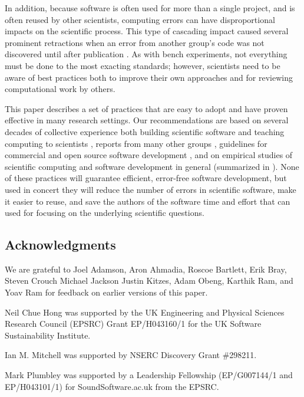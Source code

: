 \documentclass{article}
\begin{document}
In addition, because software is often used for more than a single
project, and is often reused by other scientists, computing errors can
have disproportional impacts on the scientific process. This type of
cascading impact caused several prominent retractions when an error
from another group's code was not discovered until after publication
\cite{merali2010}.  As with bench experiments, not everything must be
done to the most exacting standards; however, scientists need to be
aware of best practices both to improve their own approaches and for
reviewing computational work by others.

This paper describes a set of practices that are easy to adopt and
have proven effective in many research settings.  Our recommendations
are based on several decades of collective experience both building
scientific software and teaching computing to scientists
\cite{aranda2012,wilson2006b}, reports from many other groups
\cite{heroux2009,kane2003,kane2006,killcoyne2009,matthews2008,pitt-francis2008,pouillon2010},
guidelines for commercial and open source software development
\cite{spolsky2000,fogel2005}, and on empirical studies of scientific
computing \cite{carver2007,kelly2009,segal2005,segal2008a} and
software development in general (summarized in \cite{oram2010}). None
of these practices will guarantee efficient, error-free software
development, but used in concert they will reduce the number of errors
in scientific software, make it easier to reuse, and save the authors
of the software time and effort that can used for focusing on the
underlying scientific questions.

\subsection*{Acknowledgments}

We are grateful to
Joel Adamson,
Aron Ahmadia,
Roscoe Bartlett,
Erik Bray,
Steven Crouch
Michael Jackson
Justin Kitzes,
Adam Obeng,
Karthik Ram,
and
Yoav Ram
for feedback on earlier versions of this paper.

Neil Chue Hong was supported by the UK Engineering and Physical
Sciences Research Council (EPSRC) Grant EP/H043160/1 for the UK
Software Sustainability Institute.

Ian M. Mitchell was supported by NSERC Discovery Grant \#298211.

Mark Plumbley was supported by a Leadership Fellowship (EP/G007144/1
and EP/H043101/1) for SoundSoftware.ac.uk from the EPSRC.
\end{document}
